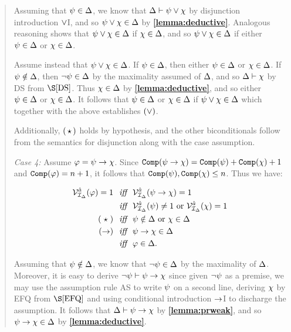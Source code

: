 \begin{quote}
  Assuming that $\psi\in\Delta$, we know that $\Delta\vdash\psi\vee\chi$ by disjunction introduction $\vee$I, and so $\psi\vee\chi\in\Delta$ by \textbf{\ref{lemma:deductive}}.
  Analogous reasoning shows that $\psi\vee\chi\in\Delta$ if $\chi\in\Delta$, and so $\psi\vee\chi\in\Delta$ if either $\psi\in\Delta$ or $\chi\in\Delta$. 

  Assume instead that $\psi\vee\chi\in\Delta$.
  If $\psi\in\Delta$, then either $\psi\in\Delta$ or $\chi\in\Delta$.
  If $\psi\notin\Delta$, then $\neg\psi\in\Delta$ by the maximality assumed of $\Delta$, and so $\Delta\vdash\chi$ by DS from $\S\ref{DS}$.
  Thus $\chi\in\Delta$ by \textbf{\ref{lemma:deductive}}, and so either $\psi\in\Delta$ or $\chi\in\Delta$. 
  It follows that $\psi\in\Delta$ or $\chi\in\Delta$ if $\psi\vee\chi\in\Delta$ which together with the above establishes $(\vee)$.  

  Additionally, $(\hspace{1.6pt}\star\hspace{1.6pt})$ holds by hypothesis, and the other biconditionals follow from the semantics for disjunction along with the case assumption.

  \textit{Case 4:}
  Assume $\varphi=\psi\rightarrow\chi$.
  Since $\texttt{Comp}(\psi\rightarrow\chi)=\texttt{Comp}(\psi)+\texttt{Comp}(\chi)+1$ and  $\texttt{Comp}(\varphi)=n+1$, it follows that $\texttt{Comp}(\psi),\texttt{Comp}(\chi)\leq n$.
  Thus we have:

  \vspace{-.2in}
  \begin{align*}
    \mathcal{V}_{\mathcal{I}_{\Delta}}^{\hat{a}}(\varphi)=1 &\textit{ ~iff~ } \mathcal{V}_{\mathcal{I}_{\Delta}}^{\hat{a}}(\psi\rightarrow\chi)=1\\
      &\textit{ ~iff~ } \mathcal{V}_{\mathcal{I}_{\Delta}}^{\hat{a}}(\psi)\neq 1 \text{ or } \mathcal{V}_{\mathcal{I}_{\Delta}}^{\hat{a}}(\chi)=1 \\
      (\hspace{2.9pt}\star\hspace{2.9pt}) &\textit{ ~iff~ } \psi\notin\Delta \text{ or } \chi\in\Delta \\
      (\rightarrow) &\textit{ ~iff~ } \psi\rightarrow\chi\in\Delta \\
      &\textit{ ~iff~ } \varphi\in\Delta.
  \end{align*}

  Assuming that $\psi\notin\Delta$, we know that $\neg\psi\in\Delta$ by the maximality of $\Delta$.
  Moreover, it is easy to derive $\neg\psi\vdash\psi\rightarrow\chi$ since given $\neg\psi$ as a premise, we may use the assumption rule AS to write $\psi$ on a second line, deriving $\chi$ by EFQ from $\S\ref{EFQ}$ and using conditional introduction $\rightarrow$I to discharge the assumption.
  It follows that $\Delta\vdash\psi\rightarrow\chi$ by \textbf{\ref{lemma:prweak}}, and so $\psi\rightarrow\chi\in\Delta$ by \textbf{\ref{lemma:deductive}}.


\end{quote}
